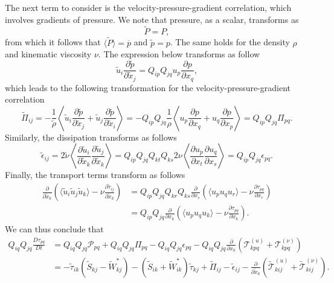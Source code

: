 \documentclass[oneside,a4paper,11pt]{report}
\newcommand{\pavg}{\overline{p}}
\newcommand{\rs}{\tau}          %
\newcommand{\ukfluc}{u_k}
\newcommand{\upfluc}{u_p}
\newcommand{\uqfluc}{u_q}
\newcommand{\urfluc}{u_r}
\begin{document}
The next term to consider is the velocity-pressure-gradient correlation, which involves gradients of pressure. We note that pressure, as a scalar, transforms as
\begin{equation}
\tilde{P} = P,
\end{equation}
from which it follows that $\langle \tilde{P} \rangle = \pavg$ and $\tilde{p} = p$. The same holds for the density $\rho$ and kinematic viscosity $\nu$. The expression below transforms as follow
\begin{equation}
\tilde{u}_i \frac{\partial \tilde{p}}{\partial \tilde{x}_j} = Q_{ip}Q_{jq}u_p \frac{\partial p}{\partial x_q},
\end{equation}
which leads to the following transformation for the velocity-pressure-gradient correlation
\begin{equation}
\tilde{\Pi}_{ij} = -\frac{1}{\tilde{\rho}} \left < \tilde{u}_i \frac{\partial \tilde{p}}{\partial \tilde{x}_j}  + \tilde{u}_j \frac{\partial \tilde{p}}{\partial \tilde{x}_i} \right > = -Q_{ip}Q_{jq} \frac{1}{\rho} \left < \upfluc \frac{\partial p}{\partial x_q} + \uqfluc \frac{\partial p}{\partial x_p}\right > = Q_{ip}Q_{jq} \Pi_{pq}.
\end{equation}
Similarly, the dissipation transforms as follows
\begin{equation}
\tilde{\epsilon}_{ij} = 2\tilde{\nu} \left < \frac{\partial \tilde u_i}{\partial \tilde{x}_k} \frac{\partial \tilde u_j}{\partial \tilde{x}_k} \right > = Q_{ip}Q_{jq} Q_{kt} Q_{ks} 2\nu \left < \frac{\partial \upfluc}{\partial x_t} \frac{\partial \uqfluc}{\partial x_s} \right > = Q_{ip}Q_{jq} \epsilon_{pq}.
\end{equation}
Finally, the transport terms transform as follows
\begin{align}
\frac{\partial}{\partial \tilde{x}_k} \left ( \langle \tilde{u}_i \tilde{u}_j \tilde{u}_k \rangle - \nu \frac{\partial \tilde{\rs}_{ij} }{\partial \tilde{x}_k} \right) &= Q_{ip}Q_{jq}Q_{kr} Q_{ks} \frac{\partial}{\partial x_s} \left ( \langle \upfluc \uqfluc \urfluc \rangle - \nu \frac{\partial \rs_{pq} }{\partial x_r} \right) \nonumber \\
& = Q_{ip}Q_{jq} \frac{\partial}{\partial x_k} \left ( \langle \upfluc \uqfluc \ukfluc \rangle - \nu \frac{\partial \rs_{pq} }{\partial x_k} \right).
\end{align}
We can thus conclude that 
\begin{align}
Q_{iq}Q_{jq} \frac{D \rs_{pq}}{Dt} &= Q_{iq}Q_{jq}\mathcal{P}_{pq} + Q_{iq}Q_{jq}\Pi_{pq} - Q_{iq}Q_{jq}\epsilon_{pq} - Q_{iq}Q_{jq}\frac{\partial}{\partial x_k} \left ( \mathcal{T}^{(u)}_{kpq} + \mathcal{T}^{(\nu)}_{kpq} \right ) \nonumber \\
& =  -\tilde{\rs}_{ik} (\tilde{S}_{kj} - \tilde{W}^*_{kj}) - (\tilde{S}_{ik} + \tilde{W}^*_{ik} ) \tilde{\rs}_{kj} + \tilde{\Pi}_{ij} - \tilde{\epsilon}_{ij} - \frac{\partial}{\partial \tilde{x}_k} \left ( \tilde{\mathcal{T}}^{(u)}_{kij} + \tilde{\mathcal{T}}^{(\nu)}_{kij} \right ).
\end{align}
\end{document}
